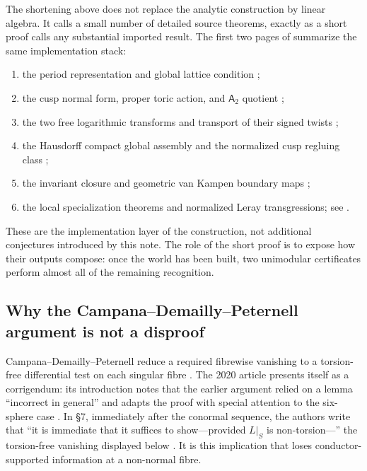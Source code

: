 \documentclass[11pt,reqno]{amsart}
\numberwithin{equation}{section}
\newcommand{\Aroot}{\mathsf{A}_2}
\theoremstyle{definition}
\begin{document}
The shortening above does not replace the analytic construction by linear algebra. It calls a small number of detailed source theorems, exactly as a short proof calls any substantial imported result. The first two pages of \cite{S6} summarize the same implementation stack:
\begin{enumerate}[label=\textup{(R\arabic*)}]
\item the period representation and global lattice condition \cite[\S2, Thm.~3.4]{S6};
\item the cusp normal form, proper toric action, and $\Aroot$ quotient \cite[Prop.~3.21, Thm.~4.5, Props.~4.6--4.7]{S6};
\item the two free logarithmic transforms and transport of their signed twists \cite[Def.~5.3, Thm.~5.4, Lem.~7.16]{S6};
\item the Hausdorff compact global assembly \cite[Thm.~6.2, Prop.~6.3]{S6} and the normalized cusp regluing class \cite[Def.~6.6, Prop.~6.7, \S7.5]{S6};
\item the invariant closure and geometric van Kampen boundary maps \cite[Lem.~2.7(iv), Lem.~7.4, Lem.~7.16, Thm.~7.17]{S6};
\item the local specialization theorems and normalized Leray transgressions; see \cite[Thm.~B.1, Prop.~7.14, Props.~7.26--7.27]{S6}.
\end{enumerate}
These are the implementation layer of the construction, not additional conjectures introduced by this note. The role of the short proof is to expose how their outputs compose: once the world has been built, two unimodular certificates perform almost all of the remaining recognition.

\subsection{Why the Campana--Demailly--Peternell argument is not a disproof}\label{sec:cdp-formal}

Campana--Demailly--Peternell reduce a required fibrewise vanishing to a torsion-free differential test on each singular fibre \cite[p.~692]{CDP20}. The 2020 article presents itself as a corrigendum: its introduction notes that the earlier argument relied on a lemma ``incorrect in general'' and adapts the proof with special attention to the six-sphere case \cite[\S1]{CDP20}. In \S7, immediately after the conormal sequence, the authors write that ``it is immediate that it suffices to show---provided $L|_S$ is non-torsion---'' the torsion-free vanishing displayed below \cite[\S7, p.~692]{CDP20}. It is this implication that loses conductor-supported information at a non-normal fibre.
\end{document}
